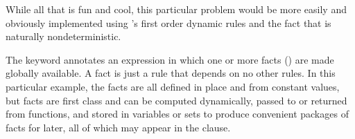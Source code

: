 While all that is fun and cool, this particular problem would be
more easily and obviously implemented using \Law{}'s first order
dynamic rules and the fact that \Law{} is naturally nondeterministic.


The  keyword annotates an expression in which one or more facts ()
are made globally available. A fact is just a rule that depends on no other
rules. In this particular example, the facts are all defined in place and
from constant values, but facts are first class and can be computed dynamically,
passed to or returned from functions, and stored in variables or sets to produce
convenient packages of facts for later, all of which may appear in the 
clause.
